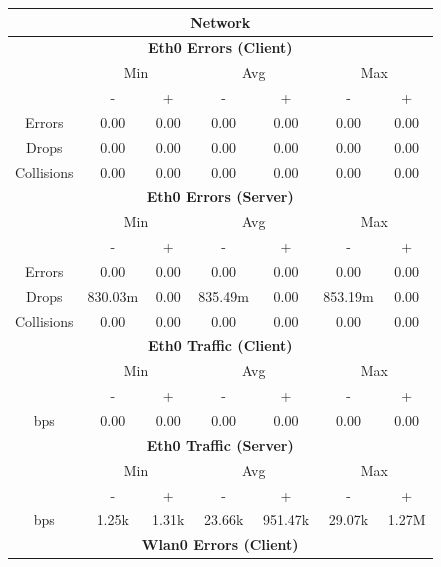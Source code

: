 \documentclass[11pt,a4paper,headinclude=false,footinclude=false]{scrreprt}
\begin{document}
\begin{table}[H]
\centering
    \begin{tabular}{||c|c|c|c|c|c|c||}
    \hline
    \multicolumn{7}{|c|}{\textbf{Network}} \\
    \hline
    \multicolumn{7}{|c|}{\textbf{Eth0 Errors (Client)}} \\
    \hline\hline
      & \multicolumn{2}{|c|}{Min} & \multicolumn{2}{|c|}{Avg} & \multicolumn{2}{|c|}{Max} \\
    \hline
     & - & + & - & + & - & + \\
    \hline
    Errors & 0.00 & 0.00 & 0.00 & 0.00 & 0.00 & 0.00 \\
    \hline
    Drops & 0.00 & 0.00 & 0.00 & 0.00 & 0.00 & 0.00 \\
    \hline
    Collisions & 0.00 & 0.00 & 0.00 & 0.00 & 0.00 & 0.00 \\
    \hline\hline
    \multicolumn{7}{|c|}{\textbf{Eth0 Errors (Server)}} \\
    \hline\hline
      & \multicolumn{2}{|c|}{Min} & \multicolumn{2}{|c|}{Avg} & \multicolumn{2}{|c|}{Max} \\
    \hline
     & - & + & - & + & - & + \\
    \hline
    Errors & 0.00 & 0.00 & 0.00 & 0.00 & 0.00 & 0.00 \\
    \hline
    Drops & 830.03m & 0.00 & 835.49m & 0.00 & 853.19m & 0.00 \\
    \hline
    Collisions & 0.00 & 0.00 & 0.00 & 0.00 & 0.00 & 0.00 \\
    \hline\hline
    \multicolumn{7}{|c|}{\textbf{Eth0 Traffic (Client)}} \\
    \hline\hline
      & \multicolumn{2}{|c|}{Min} & \multicolumn{2}{|c|}{Avg} & \multicolumn{2}{|c|}{Max} \\
    \hline
      & - & + & - & + & - & + \\
    \hline
    bps & 0.00 & 0.00 & 0.00 & 0.00 & 0.00 & 0.00 \\
    \hline\hline
    \multicolumn{7}{|c|}{\textbf{Eth0 Traffic (Server)}} \\
    \hline\hline
      & \multicolumn{2}{|c|}{Min} & \multicolumn{2}{|c|}{Avg} & \multicolumn{2}{|c|}{Max} \\
    \hline
      & - & + & - & + & - & + \\
    \hline
    bps & 1.25k & 1.31k & 23.66k & 951.47k & 29.07k & 1.27M \\
    \hline\hline
    \multicolumn{7}{|c|}{\textbf{Wlan0 Errors (Client)}} \\

\end{tabular}
\end{table}
\end{document}
